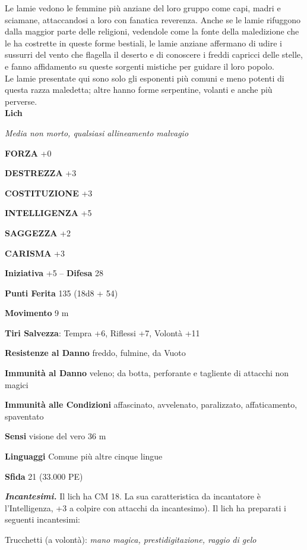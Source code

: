 \begin{multicols}{2}
Le lamie vedono le femmine più anziane del loro gruppo come capi, madri e sciamane, attaccandosi a loro con fanatica reverenza. Anche se le lamie rifuggono dalla maggior parte delle religioni, vedendole come la fonte della maledizione che le ha costrette in queste forme bestiali, le lamie anziane affermano di udire i sussurri del vento che flagella il deserto e di conoscere i freddi capricci delle stelle, e fanno affidamento su queste sorgenti mistiche per guidare il loro popolo.\\

Le lamie presentate qui sono solo gli esponenti più comuni e meno potenti di questa razza maledetta; altre hanno forme serpentine, volanti e anche più perverse.\\


\medskip{}\textbf{Lich}

\emph{Media non morto, qualsiasi allineamento malvagio}

\textbf{FORZA} +0

\textbf{DESTREZZA} +3

\textbf{COSTITUZIONE} +3

\textbf{INTELLIGENZA} +5

\textbf{SAGGEZZA} +2

\textbf{CARISMA} +3

\textbf{Iniziativa} +5 -- \textbf{Difesa} 28

\textbf{Punti Ferita} 135 (18d8 + 54)

\textbf{Movimento} 9 m

\textbf{Tiri Salvezza}: Tempra +6, Riflessi +7, Volontà +11

\textbf{Resistenze al Danno} freddo, fulmine, da Vuoto

\textbf{Immunità al Danno} veleno; da botta, perforante e tagliente di attacchi non magici

\textbf{Immunità alle Condizioni} affascinato, avvelenato, paralizzato, affaticamento, spaventato

\textbf{Sensi} visione del vero 36 m

\textbf{Linguaggi} Comune più altre cinque lingue

\textbf{Sfida} 21 (33.000 PE)

\emph{\textbf{Incantesimi.}} Il lich ha CM 18. La sua caratteristica da incantatore è l'Intelligenza, +3 a colpire con attacchi da incantesimo). Il lich ha preparati i seguenti incantesimi:

Trucchetti (a volontà): \emph{mano magica, prestidigitazione, raggio} \emph{di gelo}


\end{multicols}

